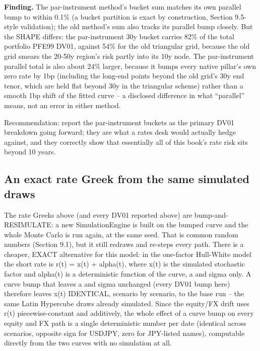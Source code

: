 \documentclass[11pt,letterpaper]{article}
\begin{document}
\textbf{Finding.} The par-instrument method's bucket sum matches its own parallel bump to within 0.1\% (a bucket partition is exact by construction, Section 9.5-style validation); the old method's sum also tracks its parallel bump closely. But the SHAPE differs: the par-instrument 30y bucket carries 82\% of the total portfolio PFE99 DV01, against 54\% for the old triangular grid, because the old grid smears the 20-50y region's risk partly into its 10y node. The par-instrument parallel total is also about 24\% larger, because it bumps every native pillar's own zero rate by 1bp (including the long-end points beyond the old grid's 30y end tenor, which are held flat beyond 30y in the triangular scheme) rather than a smooth 1bp shift of the fitted curve -- a disclosed difference in what ``parallel'' means, not an error in either method.

Recommendation: report the par-instrument buckets as the primary DV01 breakdown going forward; they are what a rates desk would actually hedge against, and they correctly show that essentially all of this book's rate risk sits beyond 10 years.

\subsection{An exact rate Greek from the same simulated draws}
The rate Greeks above (and every DV01 reported above) are bump-and-RESIMULATE: a new SimulationEngine is built on the bumped curve and the whole Monte Carlo is run again, at the same seed. That is common random numbers (Section 9.1), but it still redraws and re-steps every path. There is a cheaper, EXACT alternative for this model: in the one-factor Hull-White model the short rate is r(t) = x(t) + alpha(t), where x(t) is the simulated stochastic factor and alpha(t) is a deterministic function of the curve, a and sigma only. A curve bump that leaves a and sigma unchanged (every DV01 bump here) therefore leaves x(t) IDENTICAL, scenario by scenario, to the base run -- the same Latin Hypercube draws already simulated. Since the equity/FX drift uses r(t) piecewise-constant and additively, the whole effect of a curve bump on every equity and FX path is a single deterministic number per date (identical across scenarios, opposite sign for USDJPY, zero for JPY-listed names), computable directly from the two curves with no simulation at all.
\end{document}
